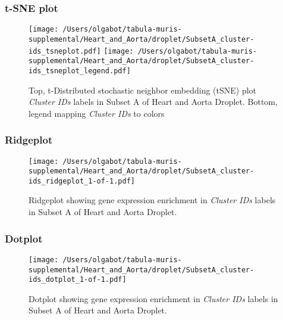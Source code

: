 \clearpage
\subsubsection{t-SNE plot}
\begin{figure}[h]
\centering
\texttt{[image: /Users/olgabot/tabula-muris-supplemental/Heart\_and\_Aorta/droplet/SubsetA\_cluster-ids\_tsneplot.pdf]}
\texttt{[image: /Users/olgabot/tabula-muris-supplemental/Heart\_and\_Aorta/droplet/SubsetA\_cluster-ids\_tsneplot\_legend.pdf]}
\caption{Top, t-Distributed stochastic neighbor embedding (tSNE) plot  \emph{Cluster IDs} labels in Subset A of Heart and Aorta Droplet. Bottom, legend mapping \emph{Cluster IDs} to colors}
\end{figure}


\clearpage

\subsubsection{Ridgeplot}
\begin{figure}[h]
\centering
\texttt{[image: /Users/olgabot/tabula-muris-supplemental/Heart\_and\_Aorta/droplet/SubsetA\_cluster-ids\_ridgeplot\_1-of-1.pdf]}

\caption{ Ridgeplot  showing gene expression enrichment in \emph{Cluster IDs} labels in Subset A of Heart and Aorta Droplet. }
\end{figure}


\clearpage

\subsubsection{Dotplot}
\begin{figure}[h]
\centering
\texttt{[image: /Users/olgabot/tabula-muris-supplemental/Heart\_and\_Aorta/droplet/SubsetA\_cluster-ids\_dotplot\_1-of-1.pdf]}

\caption{ Dotplot  showing gene expression enrichment in \emph{Cluster IDs} labels in Subset A of Heart and Aorta Droplet. }
\end{figure}

